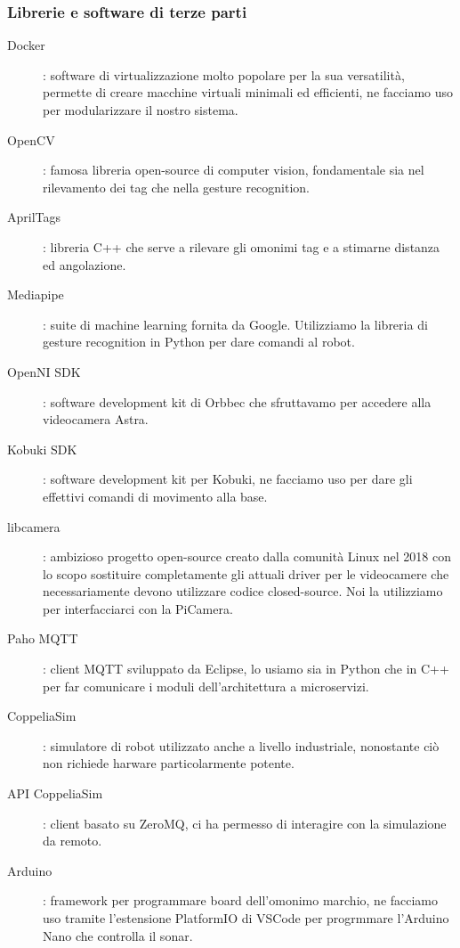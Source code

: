 \documentclass[]{article}
\begin{document}
\subsubsection{Librerie e software di terze parti}

\begin{description}
    \item[Docker]: software di virtualizzazione molto popolare per la sua versatilità, permette di creare macchine virtuali minimali ed efficienti, ne facciamo uso per modularizzare il nostro sistema.
    \item[OpenCV]: famosa libreria open-source di computer vision, fondamentale sia nel rilevamento dei tag che nella gesture recognition.
    \item[AprilTags]: libreria C++ che serve a rilevare gli omonimi tag e a stimarne distanza ed angolazione.
    \item[Mediapipe]: suite di machine learning fornita da Google. Utilizziamo la libreria di gesture recognition in Python per dare comandi al robot.
    \item[OpenNI SDK]: software development kit di Orbbec che sfruttavamo per accedere alla videocamera Astra.
    \item[Kobuki SDK]: software development kit per Kobuki, ne facciamo uso per dare gli effettivi comandi di movimento alla base.
    \item[libcamera]: ambizioso progetto open-source creato dalla comunità Linux nel 2018 con lo scopo sostituire completamente gli attuali driver per le videocamere che necessariamente devono utilizzare codice closed-source. Noi la utilizziamo per interfacciarci con la PiCamera.
    \item[Paho MQTT]: client MQTT \cite{mosquitto} sviluppato da Eclipse, lo usiamo sia in Python che in C++ per far comunicare i moduli dell'architettura a microservizi.
    \item[CoppeliaSim]: simulatore di robot utilizzato anche a livello industriale, nonostante ciò non richiede harware particolarmente potente.
    \item[API CoppeliaSim]: client basato su ZeroMQ, ci ha permesso di interagire con la simulazione da remoto.
    \item[Arduino]: framework per programmare board dell'omonimo marchio, ne facciamo uso tramite l'estensione PlatformIO di VSCode per progrmmare l'Arduino Nano che controlla il sonar.
\end{description}
\end{document}
